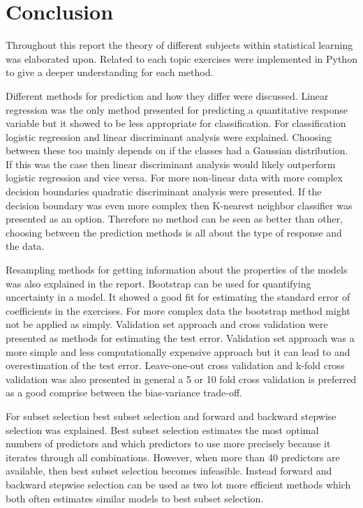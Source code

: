 \chapter{Conclusion}
\label{chp:conc}

Throughout this report the theory of different subjects within statistical learning was elaborated upon. Related to each topic exercises were implemented in Python to give a deeper understanding for each method. 

Different methods for prediction and how they differ were discussed. Linear regression was the only method presented for predicting a quantitative response variable but it showed to be less appropriate for classification. For classification logistic regression and linear discriminant analysis were explained. Choosing between these too mainly depends on if the classes had a Gaussian distribution. If this was the case then linear discriminant analysis would likely outperform logistic regression and vice versa. For more non-linear data with more complex decision boundaries quadratic discriminant analysis were presented. If the decision boundary was even more complex then K-nearest neighbor classifier was presented as an option. Therefore no method can be seen as better than other, choosing between the prediction methods is all about the type of response and the data.

Resampling methods for getting information about the properties of the models was also explained in the report. Bootstrap can be used for quantifying uncertainty in a model. It showed a good fit for estimating the standard error of coefficients in the exercises. For more complex data the bootstrap method might not be applied as simply.
Validation set approach and cross validation were presented as methods for estimating the test error. Validation set approach was a more simple and less computationally expensive approach but it can lead to and overestimation of the test error. Leave-one-out cross validation and k-fold cross validation was also presented in general a 5 or 10 fold cross validation is preferred as a good comprise between the bias-variance trade-off.

For subset selection best subset selection and forward and backward stepwise selection was explained. Best subset selection estimates the most optimal numbers of predictors and which predictors to use more precisely because it iterates through all combinations. However, when more than 40 predictors are available, then best subset selection becomes infeasible. Instead forward and backward stepwise selection can be used as two lot more efficient methods which both often estimates similar models to best subset selection.

